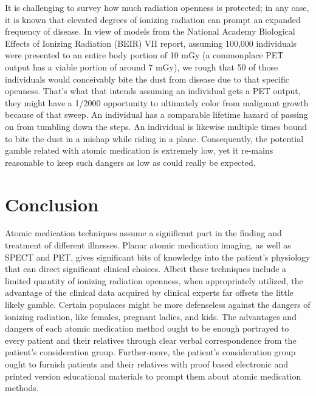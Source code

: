 \documentclass[12pt]{article}
\begin{document}
It is challenging to survey how much radiation openness is protected; in any case, it is known that elevated degrees of ionizing radiation can prompt an expanded frequency of disease. In view of models from the National Academy Biological Effects of Ionizing Radiation (BEIR) VII report, assuming 100,000 individuals were presented to an entire body portion of 10 mGy (a commonplace PET output has a viable portion of around 7 mGy), we rough that 50 of those individuals would conceivably bite the dust from disease due to that specific openness. That's what that intends assuming an individual gets a PET output, they might have a 1/2000 opportunity to ultimately color from malignant growth because of that sweep. An individual has a comparable lifetime hazard of passing on from tumbling down the steps. An individual is likewise multiple times bound to bite the dust in a mishap while riding in a plane. Consequently, the potential gamble related with atomic medication is extremely low, yet it re-mains reasonable to keep such dangers as low as could really be expected.

\section{Conclusion}
Atomic medication techniques assume a significant part in the finding and treatment of different illnesses. Planar atomic medication imaging, as well as SPECT and PET, gives significant bits of knowledge into the patient's physiology that can direct significant clinical choices. Albeit these techniques include a limited quantity of ionizing radiation openness, when appropriately utilized, the advantage of the clinical data acquired by clinical experts far offsets the little likely gamble. Certain populaces might be more defenseless against the dangers of ionizing radiation, like females, pregnant ladies, and kids. The advantages and dangers of each atomic medication method ought to be enough portrayed to every patient and their relatives through clear verbal correspondence from the patient's consideration group. Further-more, the patient's consideration group ought to furnish patients and their relatives with proof based electronic and printed version educational materials to prompt them about atomic medication methods.
\end{document}
